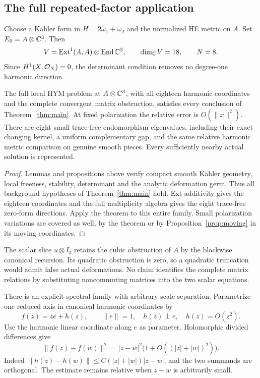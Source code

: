 \subsection{The full repeated-factor application}
Choose a K\"ahler form in $H=2\omega_1+\omega_2$ and the normalized
HE metric on $A$. Set $E_0=A\otimes\mathbb C^3$.
Then
\[
 V=\operatorname{Ext}^1(A,A)\otimes\operatorname{End}\mathbb C^3,\qquad \dim_\mathbb C V=18,\qquad N=8.
\]
Since $H^1(X,\mathcal O_X)=0$, the determinant condition removes no
degree-one harmonic direction.

\begin{corollary}\label{cor:full-application}
The full local HYM problem at $A\otimes\mathbb C^3$, with all eighteen
harmonic coordinates and the complete convergent matrix obstruction,
satisfies every conclusion of Theorem~\ref{thm:main}.
At fixed polarization the relative error is $O(\|x\|^2)$.
There are eight small trace-free endomorphism eigenvalues, including
their exact changing kernel, a uniform complementary gap, and the
same relative harmonic metric comparison on genuine smooth pieces.
Every sufficiently nearby actual solution is represented.
\end{corollary}

\begin{proof}
Lemmas and propositions above verify compact smooth K\"ahler
geometry, local freeness, stability, determinant and the analytic
deformation germ. Thus all background hypotheses of
Theorem~\ref{thm:main} hold. Ext additivity gives the eighteen
coordinates and the full multiplicity algebra gives the eight
trace-free zero-form directions. Apply the theorem to this entire
family. Small polarization variations are covered as well, by the
theorem or by Proposition~\ref{prop:moving} in its moving coordinates.
\end{proof}

The scalar slice $u\otimes I_3$ retains the cubic obstruction of
$A$ by the blockwise canonical recursion. Its quadratic obstruction
is zero, so a quadratic truncation would admit false actual
deformations. No claim identifies the complete matrix relations
by substituting noncommuting matrices into the two scalar equations.

There is an explicit spectral family with arbitrary scale
separation. Parametrize one reduced axis in canonical harmonic
coordinates by
\[
 f(z)=ze+h(z),\qquad \|e\|=1,\quad h(z)\perp e,\quad h(z)=O(z^2).
\]
Use the harmonic linear coordinate along $e$ as parameter.
Holomorphic divided differences give
\begin{equation}\label{eq:divided-difference}
 \|f(z)-f(w)\|^2
   =|z-w|^2\bigl(1+O((|z|+|w|)^2)\bigr).
\end{equation}
Indeed $\|h(z)-h(w)\|\le C(|z|+|w|)|z-w|$, and the two
summands are orthogonal. The estimate remains relative when
$z-w$ is arbitrarily small.

